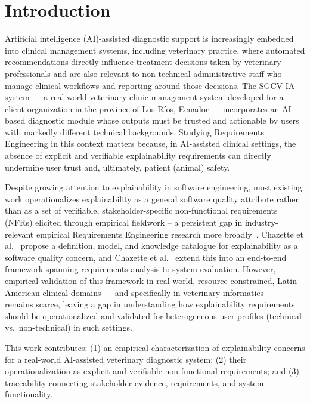 \documentclass[pdflatex,sn-mathphys-num,Numbered]{sn-jnl}
\begin{document}

\section{Introduction}\label{sec1}

Artificial intelligence (AI)-assisted diagnostic support is increasingly embedded into clinical management systems, including veterinary practice, where automated recommendations directly influence treatment decisions taken by veterinary professionals and are also relevant to non-technical administrative staff who manage clinical workflows and reporting around those decisions. The SGCV-IA system --- a real-world veterinary clinic management system developed for a client organization in the province of Los R\'ios, Ecuador --- incorporates an AI-based diagnostic module whose outputs must be trusted and actionable by users with markedly different technical backgrounds. Studying Requirements Engineering in this context matters because, in AI-assisted clinical settings, the absence of explicit and verifiable explainability requirements can directly undermine user trust and, ultimately, patient (animal) safety.

Despite growing attention to explainability in software engineering, most existing work operationalizes explainability as a general software quality attribute rather than as a set of verifiable, stakeholder-specific non-functional requirements (NFRs) elicited through empirical fieldwork -- a persistent gap in industry-relevant empirical Requirements Engineering research more broadly~\cite{fernandez2018}. Chazette et al.~\cite{chazette2021} propose a definition, model, and knowledge catalogue for explainability as a software quality concern, and Chazette et al.~\cite{chazette2022} extend this into an end-to-end framework spanning requirements analysis to system evaluation. However, empirical validation of this framework in real-world, resource-constrained, Latin American clinical domains --- and specifically in veterinary informatics --- remains scarce, leaving a gap in understanding how explainability requirements should be operationalized and validated for heterogeneous user profiles (technical vs.\ non-technical) in such settings.

This work contributes: (1) an empirical characterization of explainability concerns for a real-world AI-assisted veterinary diagnostic system; (2) their operationalization as explicit and verifiable non-functional requirements; and (3) traceability connecting stakeholder evidence, requirements, and system functionality.
\end{document}
